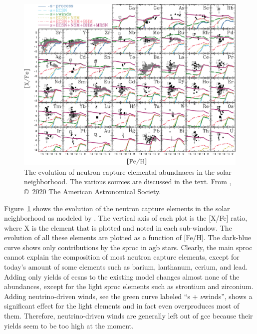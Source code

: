 \begin{figure}[tb]
    \centering
    \includegraphics[width=\textwidth]{graphics/gce/kobayashi20_fig32}
    \caption{The evolution of neutron capture elemental abundnaces in the solar neighborhood. The various sources are discussed in the text. From \citet{kobayashi20}, \copyright\ 2020 The American Astronomical Society.}
    \label{fig:gce_kob20_element_evolution_various_processes}
\end{figure}
Figure~\ref{fig:gce_kob20_element_evolution_various_processes} shows the evolution of the neutron capture elements in the solar neighborhood as modeled by \citet{kobayashi20}. The vertical axis of each plot is the [X/Fe] ratio, where X is the element that is plotted and noted in each sub-window. The evolution of all these elements are plotted as a function of [Fe/H]. The dark-blue curve shows only contributions by the \ac{sproc} in \ac{agb} stars. Clearly, the main \ac{sproc} cannot explain the composition of most neutron capture elements, except for today's amount of some elements such as barium, lanthanum, cerium, and lead. Adding only yields of \acp{ecsn} to the existing model changes almost none of the abundances, except for the light \ac{sproc} elements such as strontium and zirconium. Adding neutrino-driven winds, see the green curve labeled ``s + $\nu$winds'', shows a significant effect for the light elements and in fact even overproduces most of them. Therefore, neutrino-driven winds are generally left out of \ac{gce} because their yields seem to be too high at the moment. 

